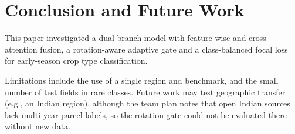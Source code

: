 \section{Conclusion and Future Work}
\label{sec:conclusion}
This paper investigated a dual-branch model with feature-wise and cross-attention fusion, a rotation-aware adaptive gate and a class-balanced focal loss for early-season crop type classification. 

Limitations include the use of a single region and benchmark, and the small number of test fields in rare classes.  Future work may test geographic transfer (e.g., an Indian region), although the team plan notes that open Indian sources lack multi-year parcel labels, so the rotation gate could not be evaluated there without new data.
